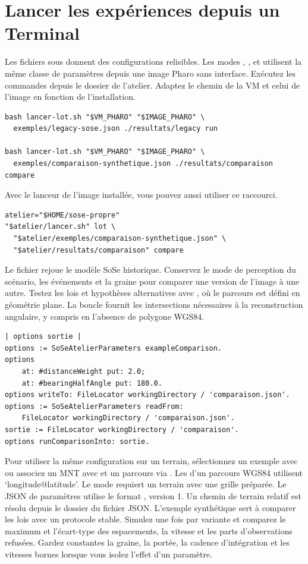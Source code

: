 \clearpage
\section{Lancer les expériences depuis un Terminal}
\label{sec:experiences}
Les fichiers sous  donnent des configurations relisibles. Les modes , ,  et  utilisent la même classe de paramètres depuis une image Pharo sans interface. Exécutez les commandes depuis le dossier de l'atelier. Adaptez le chemin de la VM et celui de l'image en fonction de l'installation.

\begin{lstlisting}
bash lancer-lot.sh "$VM_PHARO" "$IMAGE_PHARO" \
  exemples/legacy-sose.json ./resultats/legacy run

bash lancer-lot.sh "$VM_PHARO" "$IMAGE_PHARO" \
  exemples/comparaison-synthetique.json ./resultats/comparaison compare
\end{lstlisting}

Avec le lanceur de l'image installée, vous pouvez aussi utiliser ce raccourci.

\begin{lstlisting}
atelier="$HOME/sose-propre"
"$atelier/lancer.sh" lot \
  "$atelier/exemples/comparaison-synthetique.json" \
  "$atelier/resultats/comparaison" compare
\end{lstlisting}

Le fichier \sel{legacy-sose.json} rejoue le modèle SoSe historique. Conservez le mode de perception du scénario, les événements et la graine pour comparer une version de l'image à une autre. Testez les lois et hypothèses alternatives avec , où le parcours est défini en géométrie plane. La boucle fournit les intersections nécessaires à la reconstruction angulaire, y compris en l'absence de polygone WGS84.

\begin{lstlisting}
| options sortie |
options := SoSeAtelierParameters exampleComparison.
options
    at: #distanceWeight put: 2.0;
    at: #bearingHalfAngle put: 180.0.
options writeTo: FileLocator workingDirectory / 'comparaison.json'.
options := SoSeAtelierParameters readFrom:
    FileLocator workingDirectory / 'comparaison.json'.
sortie := FileLocator workingDirectory / 'comparaison'.
options runComparisonInto: sortie.
\end{lstlisting}

Pour utiliser la même configuration sur un terrain, sélectionnez un exemple avec  ou associez un MNT avec  et un parcours via . Les  d'un parcours WGS84 utilisent `longitude@latitude'. Le mode  requiert un terrain avec une grille préparée. Le JSON de paramètres utilise le format , version 1. Un chemin de terrain relatif est résolu depuis le dossier du fichier JSON. L'exemple synthétique sert à comparer les lois avec un protocole stable. Simulez une fois par variante et comparez le maximum et l'écart-type des espacements, la vitesse et les parts d'observations refusées. Gardez constantes la graine, la portée, la cadence d'intégration et les vitesses bornes lorsque vous isolez l'effet d'un paramètre.


